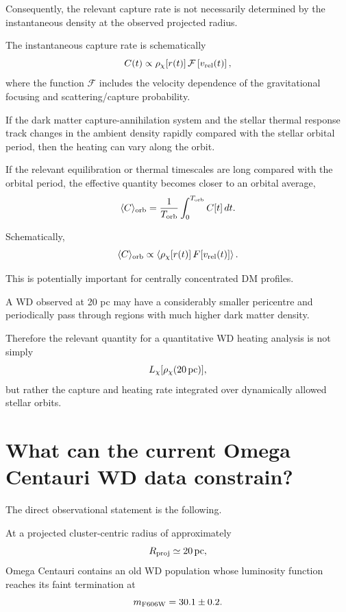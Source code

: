 \documentclass[11pt,a4paper]{article}
\begin{document}
Consequently, the relevant capture rate is not necessarily determined by the instantaneous density at the observed projected radius.

The instantaneous capture rate is schematically
\begin{equation}
C(t)
\propto
\rho_\chi[r(t)]
\,
\mathcal{F}
\left[
v_{\rm rel}(t)
\right],
\end{equation}
where the function $\mathcal{F}$ includes the velocity dependence of the gravitational focusing and scattering/capture probability.

If the dark matter capture-annihilation system and the stellar thermal response track changes in the ambient density rapidly compared with the stellar orbital period, then the heating can vary along the orbit.

If the relevant equilibration or thermal timescales are long compared with the orbital period, the effective quantity becomes closer to an orbital average,
\begin{equation}
\langle C\rangle_{\rm orb}
=
\frac{1}{T_{\rm orb}}
\int_0^{T_{\rm orb}}
C[t]\,dt.
\end{equation}

Schematically,
\begin{equation}
\langle C\rangle_{\rm orb}
\propto
\left\langle
\rho_\chi[r(t)]
\,
F[v_{\rm rel}(t)]
\right\rangle.
\end{equation}

This is potentially important for centrally concentrated DM profiles.

A WD observed at 20 pc may have a considerably smaller pericentre and periodically pass through regions with much higher dark matter density.

Therefore the relevant quantity for a quantitative WD heating analysis is not simply
\begin{equation}
L_\chi[\rho_\chi(20\,{\rm pc})],
\end{equation}
but rather the capture and heating rate integrated over dynamically allowed stellar orbits.


\section{What can the current Omega Centauri WD data constrain?}

The direct observational statement is the following.

At a projected cluster-centric radius of approximately
\begin{equation}
R_{\rm proj}\simeq20\,{\rm pc},
\end{equation}
Omega Centauri contains an old WD population whose luminosity function reaches its faint termination at
\begin{equation}
m_{\rm F606W}=30.1\pm0.2.
\end{equation}
\end{document}
